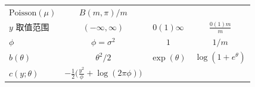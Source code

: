 \documentclass[12pt,a4paper,UTF8,twoside]{book}
\theoremstyle{definition}
\theoremstyle{definition}
\theoremstyle{definition}
\theoremstyle{remark}
\begin{document}
\begin{longtable}[]{@{}lccc@{}}
\begin{minipage}[t]{0.22\columnwidth}
\(\mathrm{Poisson}(\mu)\)\strut
\end{minipage} & \begin{minipage}[t]{0.22\columnwidth}\centering
\(B(m,\pi)/m\)\strut
\end{minipage}\tabularnewline
\begin{minipage}[t]{0.21\columnwidth}\raggedright
\(y\) 取值范围\strut
\end{minipage} & \begin{minipage}[t]{0.22\columnwidth}\centering
\((-\infty,\infty)\)\strut
\end{minipage} & \begin{minipage}[t]{0.22\columnwidth}\centering
\(0(1)\infty\)\strut
\end{minipage} & \begin{minipage}[t]{0.22\columnwidth}\centering
\(\frac{0(1)m}{m}\)\strut
\end{minipage}\tabularnewline
\begin{minipage}[t]{0.21\columnwidth}\raggedright
\(\phi\)\strut
\end{minipage} & \begin{minipage}[t]{0.22\columnwidth}\centering
\(\phi = \sigma^2\)\strut
\end{minipage} & \begin{minipage}[t]{0.22\columnwidth}\centering
\(1\)\strut
\end{minipage} & \begin{minipage}[t]{0.22\columnwidth}\centering
\(1/m\)\strut
\end{minipage}\tabularnewline
\begin{minipage}[t]{0.21\columnwidth}\raggedright
\(b(\theta)\)\strut
\end{minipage} & \begin{minipage}[t]{0.22\columnwidth}\centering
\(\theta^2/2\)\strut
\end{minipage} & \begin{minipage}[t]{0.22\columnwidth}\centering
\(\exp(\theta)\)\strut
\end{minipage} & \begin{minipage}[t]{0.22\columnwidth}\centering
\(\log(1+e^{\theta})\)\strut
\end{minipage}\tabularnewline
\begin{minipage}[t]{0.21\columnwidth}\raggedright
\(c(y;\theta)\)\strut
\end{minipage} & \begin{minipage}[t]{0.22\columnwidth}\centering
\(-\frac{1}{2}\big( \frac{y^2}{\phi} + \log(2\pi\phi) \big)\)\strut

\end{minipage}
\end{longtable}
\end{document}
